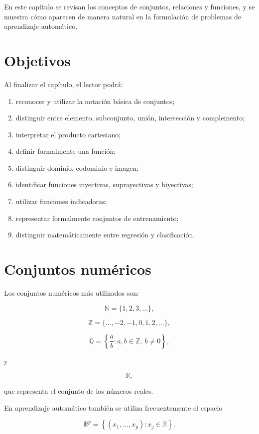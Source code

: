 \documentclass[
  spanish,
  11pt,
  letterpaper,
  DIV=11,
  numbers=noendperiod]{scrreprt}
\providecommand{\tightlist}{%
  \setlength{\itemsep}{0pt}\setlength{\parskip}{0pt}}
\theoremstyle{definition}
\theoremstyle{plain}
\theoremstyle{definition}
\theoremstyle{remark}
\begin{document}
En este capítulo se revisan los conceptos de conjuntos, relaciones y
funciones, y se muestra cómo aparecen de manera natural en la
formulación de problemas de aprendizaje automático.

\section{Objetivos}\label{objetivos}

Al finalizar el capítulo, el lector podrá:

\begin{enumerate}
\def\labelenumi{\arabic{enumi}.}
\tightlist
\item
  reconocer y utilizar la notación básica de conjuntos;
\item
  distinguir entre elemento, subconjunto, unión, intersección y
  complemento;
\item
  interpretar el producto cartesiano;
\item
  definir formalmente una función;
\item
  distinguir dominio, codominio e imagen;
\item
  identificar funciones inyectivas, suprayectivas y biyectivas;
\item
  utilizar funciones indicadoras;
\item
  representar formalmente conjuntos de entrenamiento;
\item
  distinguir matemáticamente entre regresión y clasificación.
\end{enumerate}

\section{Conjuntos numéricos}\label{conjuntos-numuxe9ricos}

Los conjuntos numéricos más utilizados son:

\[
\mathbb{N}=\{1,2,3,\ldots\},
\]

\[
\mathbb{Z}=\{\ldots,-2,-1,0,1,2,\ldots\},
\]

\[
\mathbb{Q}
=
\left\{
\frac{a}{b}:a,b\in\mathbb{Z},\ b\neq 0
\right\},
\]

y

\[
\mathbb{R},
\]

que representa el conjunto de los números reales.

En aprendizaje automático también se utiliza frecuentemente el espacio

\[
\mathbb{R}^{p}
=
\left\{
(x_1,\ldots,x_p):x_j\in\mathbb{R}
\right\}.
\]
\end{document}
